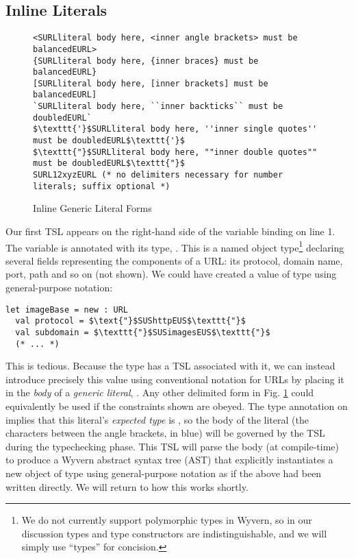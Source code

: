 \subsection{Inline Literals}
\begin{figure}[t]
\begin{lstlisting}[numbers=none]
<SURLliteral body here, <inner angle brackets> must be balancedEURL>
{SURLliteral body here, {inner braces} must be balancedEURL}
[SURLliteral body here, [inner brackets] must be balancedEURL]
`SURLliteral body here, ``inner backticks`` must be doubledEURL`
$\texttt{'}$SURLliteral body here, ''inner single quotes'' must be doubledEURL$\texttt{'}$
$\texttt{"}$SURLliteral body here, ""inner double quotes"" must be doubledEURL$\texttt{"}$
SURL12xyzEURL (* no delimiters necessary for number literals; suffix optional *)
\end{lstlisting}
\caption{Inline Generic Literal Forms}
\label{f-delims}
\end{figure}
Our first TSL appears on the right-hand side of the variable binding on line 1. The variable  is annotated with its type, . This is a named {object type}\footnote{We do not currently support polymorphic types in Wyvern, so in our discussion types and type constructors are indistinguishable, and we will simply use ``types'' for concision.} declaring several fields representing the components of a URL: its protocol, domain name, port, path and so on (not shown). We could have created a value of type  using general-purpose notation:
\begin{lstlisting}
let imageBase = new : URL
  val protocol = $\text{"}$SUShttpEUS$\texttt{"}$
  val subdomain = $\texttt{"}$SUSimagesEUS$\texttt{"}$
  (* ... *)
\end{lstlisting}
This is tedious. Because the  type has a TSL associated with it, we can instead introduce precisely this value using conventional notation for URLs by placing it in the \emph{body} of a \emph{generic literal}, . Any other delimited form in Fig. \ref{f-delims} could equivalently be used if the constraints shown are obeyed. The type annotation on  implies that this literal's \emph{expected type} is , so the {body} of the literal (the characters between the angle brackets, in blue) will be governed by the  TSL during the typechecking phase. This TSL will parse the body ({at compile-time}) to produce a Wyvern abstract syntax tree (AST) that explicitly instantiates a new object of type  using general-purpose notation as if the above had been written directly. We will return to how this works shortly. 


